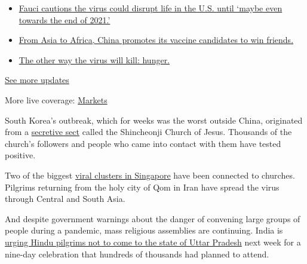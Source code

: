 \begin{itemize}
\tightlist
\item
  \href{https://www.nytimes3xbfgragh.onion/2020/09/11/world/covid-19-coronavirus.html?action=click\&pgtype=Article\&state=default\&region=MAIN_CONTENT_1\&context=storylines_live_updates\#link-dfb8a16}{Fauci
  cautions the virus could disrupt life in the U.S. until `maybe even
  towards the end of 2021.'}
\item
  \href{https://www.nytimes3xbfgragh.onion/2020/09/11/world/covid-19-coronavirus.html?action=click\&pgtype=Article\&state=default\&region=MAIN_CONTENT_1\&context=storylines_live_updates\#link-7104d154}{From
  Asia to Africa, China promotes its vaccine candidates to win friends.}
\item
  \href{https://www.nytimes3xbfgragh.onion/2020/09/11/world/covid-19-coronavirus.html?action=click\&pgtype=Article\&state=default\&region=MAIN_CONTENT_1\&context=storylines_live_updates\#link-393ad215}{The
  other way the virus will kill: hunger.}
\end{itemize}

\href{https://www.nytimes3xbfgragh.onion/2020/09/11/world/covid-19-coronavirus.html?action=click\&pgtype=Article\&state=default\&region=MAIN_CONTENT_1\&context=storylines_live_updates}{See
more updates}

More live coverage:
\href{https://www.nytimes3xbfgragh.onion/live/2020/09/11/business/stock-market-today-coronavirus?action=click\&pgtype=Article\&state=default\&region=MAIN_CONTENT_1\&context=storylines_live_updates}{Markets}

South Korea's outbreak, which for weeks was the worst outside China,
originated from a
\href{https://www.nytimes3xbfgragh.onion/2020/03/10/world/asia/south-korea-coronavirus-shincheonji.html}{secretive
sect} called the Shincheonji Church of Jesus. Thousands of the church's
followers and people who came into contact with them have tested
positive.

Two of the biggest
\href{https://www.nytimes3xbfgragh.onion/2020/03/17/world/asia/coronavirus-singapore-hong-kong-taiwan.html}{viral
clusters in Singapore} have been connected to churches. Pilgrims
returning from the holy city of Qom in Iran have spread the virus
through Central and South Asia.

And despite government warnings about the danger of convening large
groups of people during a pandemic, mass religious assemblies are
continuing. India is
\href{https://www.nytimes3xbfgragh.onion/2020/03/19/world/asia/coronavirus-india-socia-distancing.html}{urging
Hindu pilgrims not to come to the state of Uttar Pradesh} next week for
a nine-day celebration that hundreds of thousands had planned to attend.

